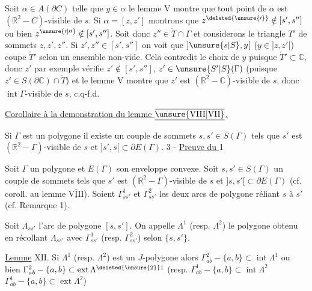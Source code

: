 Soit $\alpha\in A(\partial C)$ telle que $y\in\alpha$ le lemme V montre que tout point de $\alpha$ est $(\mathbb{R}^2-C)$-visible de $s$. Si $\alpha=[z,z']$ montrons que $z^{\deleted{\unsure{\prime}}}\notin[s',s'']$ ou bien $z^{\unsure{\prime|\prime\prime}}\notin[s',s'']$. Soit donc $z''\in\mathring{T}\cap\Gamma$ et considerons le triangle $T'$ de sommets $z,z',z''$. Si $z',z''\in[s',s'']$ on voit que $]\unsure{s|S},y[$ ($y\in]z,z'[$) coupe $\mathring{T}'$ selon un ensemble non-vide. Cela contredit le choix de $y$ puisque $\mathring{T}'\subset\mathbb{C}$,  donc $z'$ par exemple vérifie $z'\notin[s',s'']$, $z'\in\unsure{S'|S}(\Gamma)$ (puisque $z'\in S(\partial\mathbb{C})\cap\mathring{T}$) et le lemme  V montre que $z'$ est $(\mathbb{R}^2-\mathbb{C})$-visible de $s$, donc $\operatorname{int}\Gamma$-visible de $s$, c.q-f.d.

\uline{Corollaire à la demonstration du lemme $\underline{\overline{\mathrm{\unsure{VIII|VII}}}}$.} \margin{!!}

Si $\Gamma$ est un polygone il existe un couple de sommets  $s,s'\in S(\Gamma)$ tels que $s'$ est  $(\mathbb{R}^2-\Gamma)$-visible de $s$ et $]s',s[\subset\partial E(\Gamma)$.
3 - \uline{Preuve du } 1

\margin{!}Soit $\Gamma$ un polygone et $E(\Gamma)$ son enveloppe convexe. Soit $s,s'\in S(\Gamma)$ un couple de sommets  tels que $s'$ est $(\mathbb{R}^2-\Gamma)$-visible de $s$ et $]s,s'[\subset\partial E(\Gamma)$ (cf. coroll. au lemme $\underline{\overline{\mathrm{VIII}}}$). Soient $\Gamma^1_{ss'}$ et $\Gamma^2_{ss'}$ les deux arcs de polygone  réliant $s$ à $s'$ (cf. Remarque 1).
\margin{$\vert$}

Soit $\Lambda_{ss'}$ l'arc de polygone $[s,s']$. On appelle $\Lambda^1$ (resp. $\Lambda^2$) le polygone obtenu en récollant $\Lambda_{ss'}$ avec $\Gamma^1_{ss'}$ (resp. $\Gamma^2_{ss'}$) selon $\{s,s'\}$.

\uline{Lemme} $\underline{\overline{\mathrm{XII}}}$. Si $\Lambda^1$ (resp. $\Lambda^2$) est un $J$-polygone alors $\Gamma^2_{ab}-\{a,b\}\subset\operatorname{int}\Lambda^1$ ou bien $\Gamma^2_{ab}-\{a,b\}\subset\operatorname{ext}\Lambda^{\deleted{\unsure{2}}1}$ (resp. $\Gamma^1_{ab}-\{a,b\}\subset\operatorname{int}\Lambda^2$ $\Gamma^1_{ab}-\{a,b\}\subset\operatorname{ext}\Lambda^2$)

